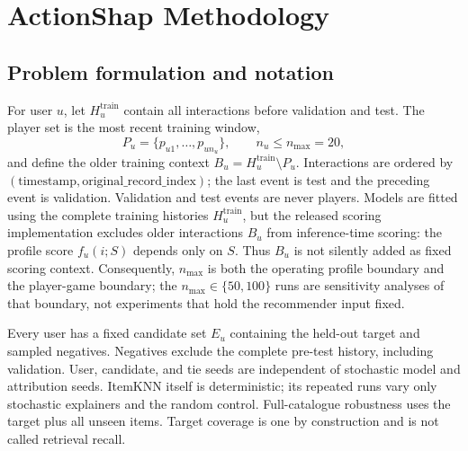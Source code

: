 \documentclass[pdflatex,sn-mathphys-num]{sn-jnl}
\begin{document}
\section{ActionShap Methodology}
\subsection{Problem formulation and notation}
For user $u$, let $H_u^{\mathrm{train}}$ contain all interactions before validation and test. The player set is the most recent training window,
\begin{equation}
P_u=\{p_{u1},\ldots,p_{un_u}\},\qquad n_u\le n_{\max}=20,
\end{equation}
and define the older training context $B_u=H_u^{\mathrm{train}}\setminus P_u$. Interactions are ordered by $(\mathrm{timestamp},\mathrm{original\_record\_index})$; the last event is test and the preceding event is validation. Validation and test events are never players. Models are fitted using the complete training histories $H_u^{\mathrm{train}}$, but the released scoring implementation excludes older interactions $B_u$ from inference-time scoring: the profile score $f_u(i;S)$ depends only on $S$. Thus $B_u$ is not silently added as fixed scoring context. Consequently, $n_{\max}$ is both the operating profile boundary and the player-game boundary; the $n_{\max}\in\{50,100\}$ runs are sensitivity analyses of that boundary, not experiments that hold the recommender input fixed.

Every user has a fixed candidate set $E_u$ containing the held-out target and sampled negatives. Negatives exclude the complete pre-test history, including validation. User, candidate, and tie seeds are independent of stochastic model and attribution seeds. ItemKNN itself is deterministic; its repeated runs vary only stochastic explainers and the random control. Full-catalogue robustness uses the target plus all unseen items. Target coverage is one by construction and is not called retrieval recall.
\end{document}
